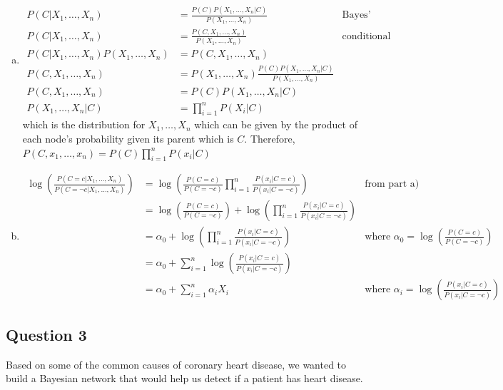 \documentclass{article}
\begin{document}
\begin{enumerate}[a)]
\item \begin{align*}
P(C | X_1, \ldots , X_n) &= \frac{P(C) P(X_1, \ldots , X_n | C)}{P(X_1, \ldots , X_n)} & \text{Bayes' Theorem} \\
P(C | X_1, \ldots , X_n) &= \frac{P(C, X_1, \ldots , X_n)}{P(X_1, \ldots , X_n)} & \text{conditional probability} \\
P(C | X_1, \ldots , X_n) P(X_1, \ldots , X_n) &= P(C, X_1, \ldots , X_n) \\
P(C, X_1, \ldots , X_n) &=  P(X_1, \ldots , X_n) \frac{P(C) P(X_1, \ldots , X_n | C)}{P(X_1, \ldots , X_n)} \\
P(C, X_1, \ldots , X_n) &=  P(C) P(X_1, \ldots , X_n | C) \\ 
P(X_1, \ldots , X_n | C) &=  \prod_{i=1}^n P(X_i | C) 
\end{align*}
which is the distribution for $X_1, \ldots, X_n$ which can be given by the product of each node's probability given its parent which is $C$.
Therefore,
$P(C, x_1, \ldots , x_n) =  P(C) \prod_{i=1}^n P(x_i | C) $
\item
\begin{align*}
\log{\left(\frac{P(C = c | X_1, \ldots, X_n)}{P(C = \neg c | X_1, \ldots, X_n)}\right)} &= \log{\left(\frac{P(C=c)}{P(C=\neg c)} \prod_{i=1}^n \frac{P(x_i | C = c)}{P(x_i | C = \neg c)}\right)} & \text{from part a)} \\
&= \log{\left(\frac{P(C=c)}{P(C=\neg c)}\right)} + \log{\left(\prod_{i=1}^n \frac{P(x_i | C = c)}{P(x_i | C = \neg c)}\right)} \\
&= \alpha_0 + \log{\left(\prod_{i=1}^n \frac{P(x_i | C = c)}{P(x_i | C = \neg c)}\right)} & \text{where } \alpha_0 = \log{\left(\frac{P(C=c)}{P(C=\neg c)}\right)} \\
&= \alpha_0 + \sum_{i=1}^n \log{\left(\frac{P(x_i | C = c)}{P(x_i | C = \neg c)}\right)} \\
&= \alpha_0 + \sum_{i=1}^n \alpha_i X_i & \text{where } \alpha_i = \log{\left(\frac{P(x_i | C = c)}{P(x_i | C = \neg c)}\right)}
\end{align*}
\end{enumerate}

\subsection{Question 3}
Based on some of the common causes of coronary heart disease, we wanted to build a Bayesian network that would help us detect if a patient has heart disease.
\end{document}
